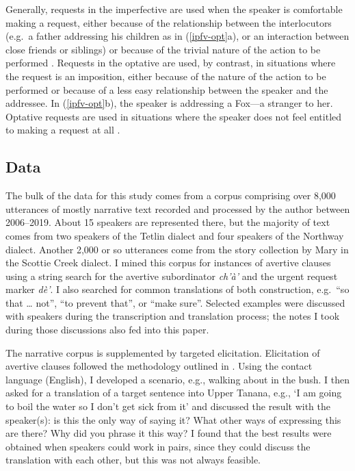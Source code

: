 \documentclass[output=paper,colorlinks,citecolor=brown
]{langscibook}
\begin{document}
Generally, requests in the imperfective are used when the speaker is comfortable making a request, either because of the relationship between the interlocutors (e.g.\  a father addressing his children as in (\ref{ipfv-opt}a), or an interaction between close friends or siblings) or because of the trivial nature of the action to be performed \citep[280--283]{LovickO2016}. Requests in the optative are used, by contrast, in situations where the request is an imposition, either because of the nature of the action to be performed or because of a less easy relationship between the speaker and the addressee. In (\ref{ipfv-opt}b), the speaker is addressing a Fox—a stranger to her. Optative requests are used in situations where the speaker does not feel entitled to making a request at all \citep[283--285]{LovickO2016}.





\subsection{Data}
\label{subsection:data}

The bulk of the data for this study comes from a corpus comprising over 8,000 utterances of mostly narrative text recorded and processed by the author between 2006--2019. About 15 speakers are represented there, but the majority of text comes from two speakers of the Tetlin dialect and four speakers of the Northway dialect. Another 2,000 or so utterances come from the story collection by Mary \citet{TyoneM1996} in the Scottie Creek dialect. I mined this corpus for instances of avertive clauses using a string search for the avertive subordinator \textit{ch'à'} and the urgent request marker \textit{dè'}. I also searched for common translations of both construction, e.g.\  ``so that {\ldots} not'',  ``to prevent that'', or ``make sure''. Selected examples were discussed with speakers during the transcription and translation process; the notes I took during those discussions also fed into this paper.

The narrative corpus is supplemented by targeted elicitation. Elicitation of avertive clauses followed the methodology outlined in \citet{VuillermetM2018questionnaire}. Using the contact language (English), I developed a scenario, e.g., walking about in the bush. I then asked for a translation of a target sentence into Upper Tanana, e.g., `I am going to boil the water so I don't get sick from it'  and discussed the result with the speaker(s): is this the only way of saying it? What other ways of expressing this are there? Why did you phrase it this way? I found that the best results were obtained when speakers could work in pairs, since they could discuss the translation with each other, but this was not always feasible. 
\end{document}
